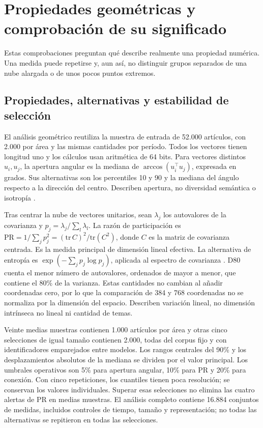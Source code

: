 \documentclass[12pt]{article}
\begin{document}
\section{Propiedades geométricas y comprobación de su significado}
Estas comprobaciones preguntan qué describe realmente una propiedad numérica. Una medida puede repetirse y, aun así, no distinguir grupos separados de una nube alargada o de unos pocos puntos extremos.

\subsection{Propiedades, alternativas y estabilidad de selección}
El análisis geométrico reutiliza la muestra de entrada de 52.000 artículos, con 2.000 por área y las mismas cantidades por período. Todos los vectores tienen longitud uno y los cálculos usan aritmética de 64 bits. Para vectores distintos $u_i,u_j$, la apertura angular es la mediana de $\arccos(u_i^\top u_j)$, expresada en grados. Sus alternativas son los percentiles 10 y 90 y la mediana del ángulo respecto a la dirección del centro. Describen apertura, no diversidad semántica o isotropía \citep{rudman-etal-2022-isoscore}.

Tras centrar la nube de vectores unitarios, sean $\lambda_j$ los autovalores de la covarianza y $p_j=\lambda_j/\sum_l\lambda_l$. La razón de participación es $\mathrm{PR}=1/\sum_j p_j^2=(\mathrm{tr}\,C)^2/\mathrm{tr}(C^2)$, donde $C$ es la matriz de covarianza centrada. Es la medida principal de dimensión lineal efectiva. La alternativa de entropía es $\exp(-\sum_j p_j\log p_j)$, aplicada al espectro de covarianza \citep{roy_2007_40328}. D80 cuenta el menor número de autovalores, ordenados de mayor a menor, que contiene el 80\% de la varianza. Estas cantidades no cambian al añadir coordenadas cero, por lo que la comparación de 384 y 768 coordenadas no se normaliza por la dimensión del espacio. Describen variación lineal, no dimensión intrínseca no lineal ni cantidad de temas.

Veinte medias muestras contienen 1.000 artículos por área y otras cinco selecciones de igual tamaño contienen 2.000, todas del corpus fijo y con identificadores emparejados entre modelos. Los rangos centrales del 90\% y los desplazamientos absolutos de la mediana se dividen por el valor principal. Los umbrales operativos son 5\% para apertura angular, 10\% para PR y 20\% para conexión. Con cinco repeticiones, los cuantiles tienen poca resolución; se conservan los valores individuales. Superar esas selecciones no elimina las cuatro alertas de PR en medias muestras. El análisis completo contiene 16.884 conjuntos de medidas, incluidos controles de tiempo, tamaño y representación; no todas las alternativas se repitieron en todas las selecciones.

\FloatBarrier
\clearpage
\end{document}
